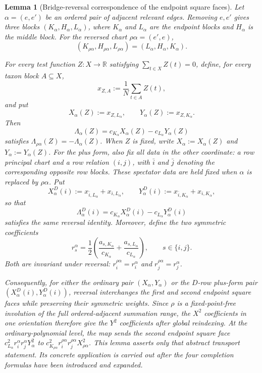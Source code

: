 \documentclass[11pt]{article}
\newtheorem{lemma}[theorem]{Lemma}
\begin{document}
\begin{lemma}[Bridge-reversal correspondence of the endpoint square faces]
\label{lem:bridge-ledger}
Let $\alpha=(e,e')$ be an ordered pair of adjacent relevant edges.  Removing
$e,e'$ gives three blocks $(K_\alpha,H_\alpha,L_\alpha)$, where $K_\alpha$
and $L_\alpha$ are the endpoint blocks and $H_\alpha$ is the middle block.
For the reversed chart $\rho\alpha=(e',e)$,
\[
(K_{\rho\alpha},H_{\rho\alpha},L_{\rho\alpha})
=(L_\alpha,H_\alpha,K_\alpha).
\]
\begin{samepage}
For every test function $Z:X\to\mathbb R$ satisfying
$\sum_{t\in X}Z(t)=0$, define, for every taxon block $A\subseteq X$,
\[
 x_{Z,A}:=\frac1N\sum_{t\in A}Z(t),
\]
and put
\[
 X_\alpha(Z):=x_{Z,L_\alpha},\qquad
 Y_\alpha(Z):=x_{Z,K_\alpha}.
\]
Then
\[
\Lambda_\alpha(Z)
=c_{K_\alpha}X_\alpha(Z)-c_{L_\alpha}Y_\alpha(Z)
\]
satisfies $\Lambda_{\rho\alpha}(Z)=-\Lambda_\alpha(Z)$.  When $Z$ is fixed,
write $X_\alpha:=X_\alpha(Z)$ and $Y_\alpha:=Y_\alpha(Z)$.
For the plus form, also fix all data in the other coordinate: a row principal
chart and a row relation $(i,j)$, with $\bar i$ and $\bar j$ denoting the
corresponding opposite row blocks.  These spectator data are held fixed when
$\alpha$ is replaced by $\rho\alpha$.  Put
\[
 X_\alpha^D(i):=x_{\bar i,L_\alpha}+x_{i,L_\alpha},\qquad
 Y_\alpha^D(i):=x_{\bar i,K_\alpha}+x_{i,K_\alpha},
\]
so that
\[
\Lambda_\alpha^D(i)
=c_{K_\alpha}X_\alpha^D(i)-c_{L_\alpha}Y_\alpha^D(i)
\]
satisfies the same reversal identity.  Moreover, define the two symmetric
coefficients
\[
r_s^\alpha=\frac12\left(\frac{a_{s,K_\alpha}}{c_{K_\alpha}}
+\frac{a_{s,L_\alpha}}{c_{L_\alpha}}\right),
\qquad s\in\{i,j\}.
\]
Both are invariant under reversal:
$r_i^{\rho\alpha}=r_i^\alpha$ and
$r_j^{\rho\alpha}=r_j^\alpha$.
\end{samepage}

Consequently, for either the ordinary pair $(X_\alpha,Y_\alpha)$ or the
$D$-row plus-form pair $(X_\alpha^D(i),Y_\alpha^D(i))$, reversal interchanges
the first and second endpoint square faces while preserving their symmetric
weights.  Since $\rho$ is a fixed-point-free involution of the full
ordered-adjacent summation range, the $X^2$ coefficients in one orientation
therefore give the $Y^2$ coefficients after global reindexing.  At the
ordinary-polynomial level, the map sends
the second endpoint square face
$c_{L_\alpha}^{2}r_i^\alpha r_j^\alpha Y_\alpha^2$ to
$c_{K_{\rho\alpha}}^{2}r_i^{\rho\alpha}
r_j^{\rho\alpha}X_{\rho\alpha}^2$.  This lemma asserts only that abstract
transport statement.  Its concrete application is carried out after the four
completion formulas have been introduced and expanded.
\end{lemma}
\end{document}
